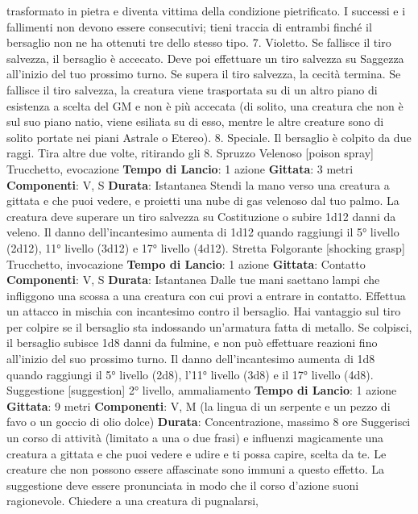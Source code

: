 \begin{multicols}{2}
trasformato in pietra e diventa vittima della condizione
pietrificato. I successi e i fallimenti non devono essere
consecutivi; tieni traccia di entrambi finché il bersaglio
non ne ha ottenuti tre dello stesso tipo.
7. Violetto. Se fallisce il tiro salvezza, il bersaglio è
accecato. Deve poi effettuare un tiro salvezza su
Saggezza all’inizio del tuo prossimo turno. Se supera il
tiro salvezza, la cecità termina. Se fallisce il tiro
salvezza, la creatura viene trasportata su di un altro
piano di esistenza a scelta del GM e non è più accecata
(di solito, una creatura che non è sul suo piano natio,
viene esiliata su di esso, mentre le altre creature sono
di solito portate nei piani Astrale o Etereo).
8. Speciale. Il bersaglio è colpito da due raggi. Tira
altre due volte, ritirando gli 8.
Spruzzo Velenoso
[poison spray]
Trucchetto, evocazione
\textbf{Tempo di Lancio}: 1 azione
\textbf{Gittata}: 3 metri
\textbf{Componenti}: V, S
\textbf{Durata}: Istantanea
Stendi la mano verso una creatura a gittata e che puoi
vedere, e proietti una nube di gas velenoso dal tuo
palmo. La creatura deve superare un tiro salvezza su
Costituzione o subire 1d12 danni da veleno.
Il danno dell’incantesimo aumenta di 1d12 quando
raggiungi il 5° livello (2d12), 11° livello (3d12) e 17°
livello (4d12).
Stretta Folgorante
[shocking grasp]
Trucchetto, invocazione
\textbf{Tempo di Lancio}: 1 azione
\textbf{Gittata}: Contatto
\textbf{Componenti}: V, S
\textbf{Durata}: Istantanea
Dalle tue mani saettano lampi che infliggono una
scossa a una creatura con cui provi a entrare in
contatto. Effettua un attacco in mischia con incantesimo
contro il bersaglio. Hai vantaggio sul tiro per colpire se il
bersaglio sta indossando un’armatura fatta di metallo.
Se colpisci, il bersaglio subisce 1d8 danni da fulmine, e
non può effettuare reazioni fino all’inizio del suo
prossimo turno.
Il danno dell’incantesimo aumenta di 1d8 quando
raggiungi il 5° livello (2d8), l’11° livello (3d8) e il 17°
livello (4d8).
Suggestione
[suggestion]
2° livello, ammaliamento
\textbf{Tempo di Lancio}: 1 azione
\textbf{Gittata}: 9 metri
\textbf{Componenti}: V, M (la lingua di un serpente e un pezzo
di favo o un goccio di olio dolce)
\textbf{Durata}: Concentrazione, massimo 8 ore
Suggerisci un corso di attività (limitato a una o due
frasi) e influenzi magicamente una creatura a gittata e
che puoi vedere e udire e ti possa capire, scelta da te.
Le creature che non possono essere affascinate sono
immuni a questo effetto. La suggestione deve essere
pronunciata in modo che il corso d’azione suoni
ragionevole. Chiedere a una creatura di pugnalarsi,

\end{multicols}
